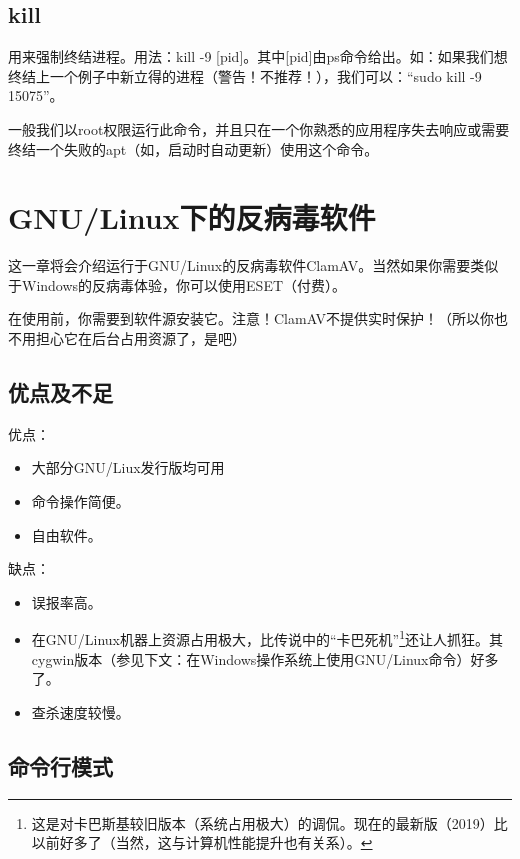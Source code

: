 \documentclass{book}
\begin{document}
\subsection{kill}
用来强制终结进程。用法：kill -9 [pid]。其中[pid]由ps命令给出。如：如果我们想终结上一个例子中新立得的进程（警告！不推荐！），我们可以：“sudo kill -9 15075”。\par
一般我们以root权限运行此命令，并且只在一个你熟悉的应用程序失去响应或需要终结一个失败的apt（如，启动时自动更新）使用这个命令。{\color{red}{不要终结你不熟悉的进程，它可能是系统进程！}}
\section{GNU/Linux下的反病毒软件}
这一章将会介绍运行于GNU/Linux的反病毒软件ClamAV。当然如果你需要类似于Windows的反病毒体验，你可以使用ESET（付费）。\par
在使用前，你需要到软件源安装它。注意！ClamAV不提供实时保护！（所以你也不用担心它在后台占用资源了，是吧）
\subsection{优点及不足}
优点：
\begin{itemize}
	\item 大部分GNU/Liux发行版均可用
	\item 命令操作简便。
	\item 自由软件。
\end{itemize}
缺点：
\begin{itemize}
	\item 误报率高。
	\item 在GNU/Linux机器上资源占用极大，比传说中的“卡巴死机”\footnote{这是对卡巴斯基较旧版本（系统占用极大）的调侃。现在的最新版（2019）比以前好多了（当然，这与计算机性能提升也有关系）。}还让人抓狂。其cygwin版本（参见下文：在Windows操作系统上使用GNU/Linux命令）好多了。
	\item 查杀速度较慢。
\end{itemize}
\subsection{命令行模式}
\end{document}
